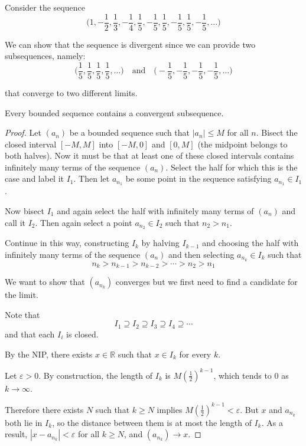 \begin{example}
Consider the sequence 
$$\big( 1, - \frac{1}{2}, \frac{1}{3}, -\frac{1}{4}, \frac{1}{5}, -\frac{1}{5}, \frac{1}{5}, -\frac{1}{5}, \frac{1}{5}, -\frac{1}{5},\ldots	\big)$$

We can show that the sequence is divergent since we can provide two subsequences, namely:
$$ \big( \frac{1}{5}, \frac{1}{5}, \frac{1}{5}, \frac{1}{5},  \ldots \big) \quad \text{and} \quad \big( -\frac{1}{5},-\frac{1}{5},-\frac{1}{5},-\frac{1}{5}, \ldots \big) $$

that converge to two different limits.
\end{example}

\begin{theorem} Every bounded sequence contains a convergent subsequence.\end{theorem}

\begin{proof}
Let $(a_n)$ be a bounded sequence such that $|a_n| \leq M$ for all $n$.  Bisect the closed interval $[-M, M]$ into $[-M, 0]$ and $[0,M]$ (the midpoint belongs to both halves).  Now it must be that at least one of these closed intervals contains infinitely many terms of the sequence $(a_n)$.  Select the half for which this is the case and label it $I_1$.  Then let $a_{n_1}$ be some point in the sequence satisfying $a_{n_1} \in I_1$.

Now bisect $I_1$ and again select the half with infinitely many terms of $(a_n)$ and call it $I_2$.  Then again select a point $a_{n_2} \in I_2$ such that $n_2> n_1$.

Continue in this way, constructing $I_{k}$ by halving $I_{k-1}$ and choosing the half with infinitely many terms of the sequence $(a_n)$ and then selecting $a_{n_k} \in I_{k}$ such that
\[	n_k  > n_{k-1} > n_{k-2} > \cdots > n_{2} > n_{1}	\]


We want to show that $(a_{n_k})$ converges but we first need to find a candidate for the limit.

Note that 
\[	I_1 \supseteq I_2 \supseteq I_3 \supseteq I_4 \supseteq	\cdots \]
and that each $I_i$ is closed.

By the NIP, there exists $x \in \mathbb{R}$ such that $x \in I_k$ for every $k$.


Let $\varepsilon >0$.  By construction, the length of $I_k$ is $M (\frac{1}{2})^{k-1}$, which tends to $0$ as $k \to \infty$.

Therefore there exists $N$ such that $k \geq N$ implies $M (\frac{1}{2})^{k-1} < \varepsilon$.  But $x$ and $a_{n_k}$ both lie in $I_k$, so the distance between them is at most the length of $I_k$.  As a result, $|x-a_{n_k}|< \varepsilon$ for all $k \geq N$, and $(a_{n_k}) \to x$.

\end{proof}

